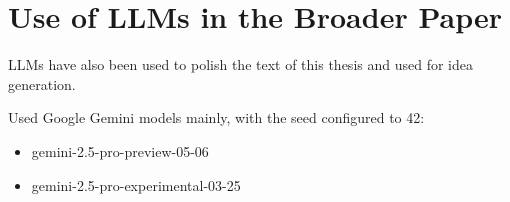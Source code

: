 \section{Use of LLMs in the Broader Paper}
\label{sec:3_4}

LLMs have also been used to polish the text of this thesis and used for idea generation.

Used Google Gemini models mainly, with the seed configured to 42:
\begin{itemize}
    \item gemini-2.5-pro-preview-05-06
    \item gemini-2.5-pro-experimental-03-25
\end{itemize}




